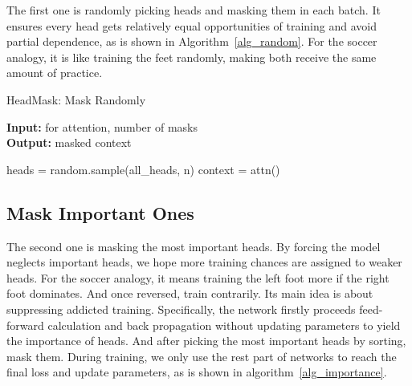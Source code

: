 \documentclass[11pt]{article}
\begin{document}
The first one is randomly picking heads and masking them in each batch. It ensures every head gets relatively equal opportunities of training and avoid partial dependence, as is shown in Algorithm~\ref{alg_random}. For the soccer analogy, it is like training the feet randomly, making both receive the same amount of practice.

\begin{algorithm}[h]\footnotesize
    \caption{HeadMask: Mask Randomly}
    \label{alg_random}
    \begin{flushleft}
        \hspace*{0.02in} {\bf Input:}  for attention, number of masks \\
        \hspace*{0.02in} {\bf Output:} masked context
    \end{flushleft}
    \begin{algorithmic}[1]
            \STATE heads = random.sample(all\_heads, n)
                \STATE 
            \ENDFOR
            \STATE context = attn()
        \ENDFOR
    \end{algorithmic}
\end{algorithm}

\subsection{Mask Important Ones}

The second one is masking the most important heads. By forcing the model neglects important heads, we hope more training chances are assigned to weaker heads. For the soccer analogy, it means training the left foot more if the right foot dominates. And once reversed, train contrarily. Its main idea is about suppressing addicted training. Specifically, the network firstly proceeds feed-forward calculation and back propagation without updating parameters to yield the importance of heads. And after picking the most important heads by sorting, mask them. During training, we only use the rest part of networks to reach the final loss and update parameters, as is shown in algorithm~\ref{alg_importance}.
\end{document}
